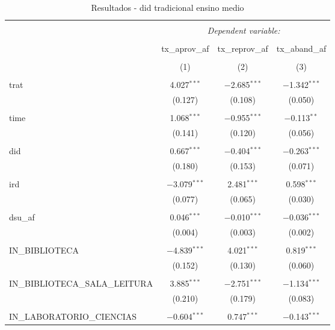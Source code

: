 
\begin{table}[!htbp] \centering 
  \caption{Resultados - did tradicional ensino medio} 
  \label{} 
\begin{tabular}{@{\extracolsep{5pt}}lccc} 
\\[-1.8ex]\hline 
\hline \\[-1.8ex] 
 & \multicolumn{3}{c}{\textit{Dependent variable:}} \\ 
\cline{2-4} 
\\[-1.8ex] & tx\_aprov\_af & tx\_reprov\_af & tx\_aband\_af \\ 
\\[-1.8ex] & (1) & (2) & (3)\\ 
\hline \\[-1.8ex] 
 trat & 4.027$^{***}$ & $-$2.685$^{***}$ & $-$1.342$^{***}$ \\ 
  & (0.127) & (0.108) & (0.050) \\ 
  & & & \\ 
 time & 1.068$^{***}$ & $-$0.955$^{***}$ & $-$0.113$^{**}$ \\ 
  & (0.141) & (0.120) & (0.056) \\ 
  & & & \\ 
 did & 0.667$^{***}$ & $-$0.404$^{***}$ & $-$0.263$^{***}$ \\ 
  & (0.180) & (0.153) & (0.071) \\ 
  & & & \\ 
 ird & $-$3.079$^{***}$ & 2.481$^{***}$ & 0.598$^{***}$ \\ 
  & (0.077) & (0.065) & (0.030) \\ 
  & & & \\ 
 dsu\_af & 0.046$^{***}$ & $-$0.010$^{***}$ & $-$0.036$^{***}$ \\ 
  & (0.004) & (0.003) & (0.002) \\ 
  & & & \\ 
 IN\_BIBLIOTECA & $-$4.839$^{***}$ & 4.021$^{***}$ & 0.819$^{***}$ \\ 
  & (0.152) & (0.130) & (0.060) \\ 
  & & & \\ 
 IN\_BIBLIOTECA\_SALA\_LEITURA & 3.885$^{***}$ & $-$2.751$^{***}$ & $-$1.134$^{***}$ \\ 
  & (0.210) & (0.179) & (0.083) \\ 
  & & & \\ 
 IN\_LABORATORIO\_CIENCIAS & $-$0.604$^{***}$ & 0.747$^{***}$ & $-$0.143$^{***}$ \\ 

\end{tabular}
\end{table}
